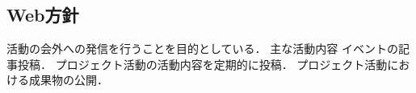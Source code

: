 \subsection*{Web方針}

活動の会外への発信を行うことを目的としている．
主な活動内容
    イベントの記事投稿．
    プロジェクト活動の活動内容を定期的に投稿．
    プロジェクト活動における成果物の公開．
    